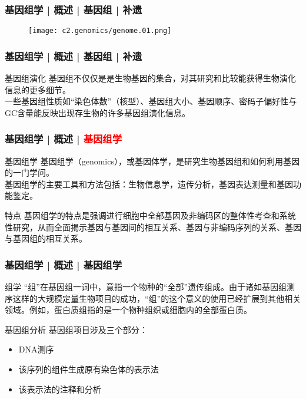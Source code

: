 \begin{frame}
  \frametitle{基因组学 | 概述 | 基因组 | 补遗}
  \begin{figure}
    \centering
    \texttt{[image: c2.genomics/genome.01.png]}
  \end{figure}
\end{frame}

\begin{frame}
  \frametitle{基因组学 | 概述 | 基因组 | 补遗}
  \begin{block}{基因组演化}
基因组不仅仅是是生物基因的集合，对其研究和比较能获得生物演化信息的更多细节。\\
\vspace{1em}
一些基因组性质如“染色体数”（核型）、基因组大小、基因顺序、密码子偏好性与GC含量能反映出现存生物的许多基因组演化信息。
  \end{block}
\end{frame}

\begin{frame}
  \frametitle{基因组学 | 概述 | \textcolor{red}{基因组学}}
  \begin{block}{基因组学}
基因组学（genomics），或基因体学，是研究生物基因组和如何利用基因的一门学问。\\
\vspace{0.5em}
基因组学的主要工具和方法包括：生物信息学，遗传分析，基因表达测量和基因功能鉴定。
  \end{block}
  \pause
  \begin{block}{特点}
基因组学的特点是强调进行细胞中全部基因及非编码区的整体性考查和系统性研究，从而全面揭示基因与基因间的相互关系、基因与非编码序列的关系、基因与基因组的相互关系。
  \end{block}
\end{frame}

\begin{frame}
  \frametitle{基因组学 | 概述 | 基因组学}
  \begin{block}{组学}
“组”在基因组一词中，意指一个物种的“全部”遗传组成。由于诸如基因组测序这样的大规模定量生物项目的成功，“组”的这个意义的使用已经扩展到其他相关领域。例如，蛋白质组指的是一个物种组织或细胞内的全部蛋白质。 
  \end{block}
  \pause
  \begin{block}{基因组分析}
基因组项目涉及三个部分：
\begin{itemize}
  \item DNA测序
  \item 该序列的组件生成原有染色体的表示法
  \item 该表示法的注释和分析
\end{itemize}
  \end{block}
\end{frame}

